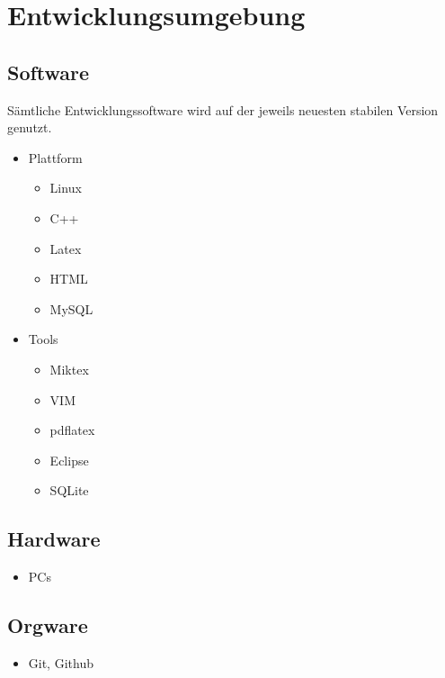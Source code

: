 
\section{Entwicklungsumgebung}


\subsection{Software}

Sämtliche Entwicklungssoftware wird auf der jeweils neuesten stabilen Version genutzt.

\begin{itemize}
	\item Plattform
		\begin{itemize}
		\item Linux
			\item C++
			\item Latex
			\item HTML
			\item MySQL
		\end{itemize}
	\item Tools
		\begin{itemize}
			\item Miktex
			\item VIM
			\item pdflatex
			\item Eclipse
			\item SQLite
		\end{itemize}

\end{itemize}

\subsection{Hardware}

\begin{itemize}
	\item PCs
\end{itemize}

\subsection{Orgware}

\begin{itemize}
	\item Git, Github
\end{itemize}
